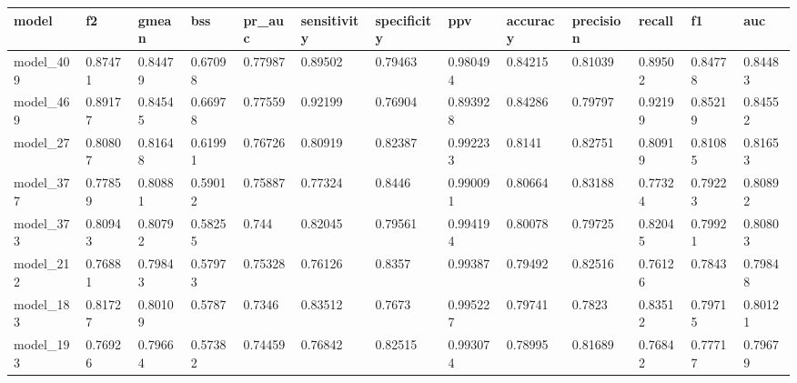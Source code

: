 \begin{tabular}{|l|l|l|l|l|l|l|l|l|l|l|l|l|}
\hline
\textbf{model} & \textbf{f2} & \textbf{gmean} & \textbf{bss} & \textbf{pr\_auc} & \textbf{sensitivity} & \textbf{specificity} & \textbf{ppv} & \textbf{accuracy} & \textbf{precision} & \textbf{recall} & \textbf{f1} & \textbf{auc} \\ \hline
model\_409     & 0.87471     & 0.84479        & 0.67098      & 0.77987          & 0.89502              & 0.79463              & 0.980494     & 0.84215           & 0.81039            & 0.89502         & 0.84778     & 0.84483      \\ \hline
model\_469     & 0.89177     & 0.84545        & 0.66978      & 0.77559          & 0.92199              & 0.76904              & 0.893928     & 0.84286           & 0.79797            & 0.92199         & 0.85219     & 0.84552      \\ \hline
model\_27      & 0.80807     & 0.81648        & 0.61991      & 0.76726          & 0.80919              & 0.82387              & 0.992233     & 0.8141            & 0.82751            & 0.80919         & 0.81085     & 0.81653      \\ \hline
model\_377     & 0.77859     & 0.80881        & 0.59012      & 0.75887          & 0.77324              & 0.8446               & 0.990091     & 0.80664           & 0.83188            & 0.77324         & 0.79223     & 0.80892      \\ \hline
model\_373     & 0.80943     & 0.80792        & 0.58255      & 0.744            & 0.82045              & 0.79561              & 0.994194     & 0.80078           & 0.79725            & 0.82045         & 0.79921     & 0.80803      \\ \hline
model\_212     & 0.76881     & 0.79843        & 0.57973      & 0.75328          & 0.76126              & 0.8357               & 0.99387      & 0.79492           & 0.82516            & 0.76126         & 0.7843      & 0.79848      \\ \hline
model\_183     & 0.81727     & 0.80109        & 0.5787       & 0.7346           & 0.83512              & 0.7673               & 0.995227     & 0.79741           & 0.7823             & 0.83512         & 0.79715     & 0.80121      \\ \hline
model\_193     & 0.76926     & 0.79664        & 0.57382      & 0.74459          & 0.76842              & 0.82515              & 0.993074     & 0.78995           & 0.81689            & 0.76842         & 0.77717     & 0.79679      \\ \hline

\end{tabular}
